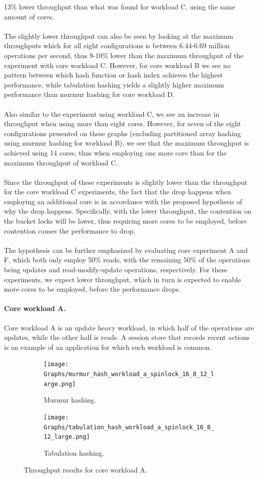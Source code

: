 \documentclass[11pt]{report} %
\begin{document}
13\% lower throughput than what was found for workload C, using the same amount of cores.\\
\\
The slightly lower throughput can also be seen by looking at the maximum throughputs which for all eight configurations is between 6.44-6.69 million operations per second, thus 9-10\% lower than the maximum throughput of the experiment with core workload C. However, for core workload B we see no pattern between which hash function or hash index achieves the highest performance, while tabulation hashing yields a slightly higher maximum performance than murmur hashing for core workload D. \\
\\
Also similar to the experiment using workload C, we see an increase in throughput when using more than eight cores. However, for seven of the eight configurations presented on these graphs (excluding partitioned array hashing using murmur hashing for workload B), we see that the maximum throughput is achieved using 14 cores, thus when employing one more core than for the maximum throughput of workload C. \\
\\
Since the throughput of these experiments is slightly lower than the throughput for the core workload C experiments, the fact that the drop happens when employing an additional core is in accordance with the proposed hypothesis of why the drop happens. Specifically, with the lower throughput, the contention on the bucket locks will be lower, thus requiring more cores to be employed, before contention causes the performance to drop.\\
\\
The hypothesis can be further emphasized by evaluating core experiment A and F, which both only employ 50\% reads, with the remaining 50\% of the operations being updates and read-modify-update operations, respectively. For these experiments, we expect lower throughput, which in turn is expected to enable more cores to be employed, before the performance drops.
\paragraph{Core workload A.} Core workload A is an update heavy workload, in which half of the operations are updates, while the other half is reads. A session store that records recent actions is an example of an application for which such workload is common. 
\begin{figure}[ht]
  \centering
  \begin{subfigure}[b]{0.45\textwidth}
    \texttt{[image: Graphs/murmur\_hash\_workload\_a\_spinlock\_16\_8\_12\_large.png]}
    \caption[]{Murmur hashing.}
    \label{fig:mur_a}
  \end{subfigure} \hfill
  \begin{subfigure}[b]{0.45\textwidth}
    \texttt{[image: Graphs/tabulation\_hash\_workload\_a\_spinlock\_16\_8\_12\_large.png]}
    \caption[]{Tabulation hashing.}
    \label{fig:tab_a}
  \end{subfigure}
  \caption[]{Throughput results for core workload A.}
  \label{fig:res_a}
\end{figure}
\end{document}
